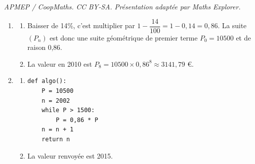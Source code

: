 \documentclass[10pt]{article}
\begin{document}
\noindent\textit{APMEP / CoopMaths. CC BY-SA. Présentation adaptée par Maths Explorer.}\par\medskip
\begin{enumerate}
\item 
\begin{enumerate}
	\item  	Baisser de 14\%, c'est multiplier par $1 - \dfrac{14}{100} = 1 - 0,14 = 0,86$. La suite $(P_n)$ est donc une suite géométrique de premier terme $P_0 = 10500$ et de raison 0,86.
		
		\item 	La valeur en 2010 est $P_8 = 10500 \times 0,86^8 \approx 3141,79$ €.
		\end{enumerate}
		\item 	\begin{enumerate}
				\item 			
\begin{lstlisting}[style=python]
def algo():
	P = 10500
	n = 2002
	while P > 1500:
		P = 0,86 * P
	n = n + 1
	return n
\end{lstlisting}
			\item	La valeur renvoyée est 2015.
		\end{enumerate}
	\end{enumerate}
\end{document}
